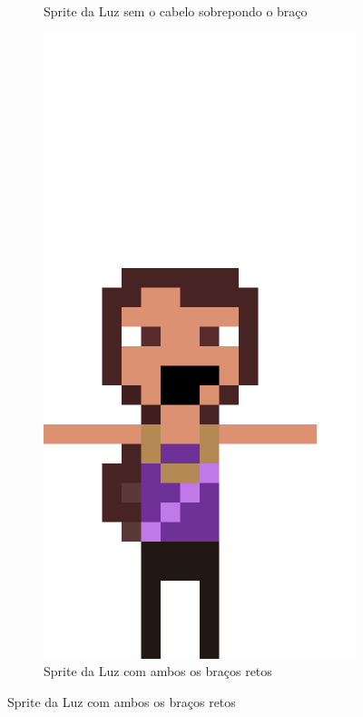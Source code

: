 \begin{figure}[htbp]
\begin{subfigure}{0.32\linewidth}
        \caption{\small Sprite da Luz sem o cabelo sobrepondo o braço}
        \label{fig:sketchIrma2}
    \end{subfigure}
    \begin{subfigure}{0.32\linewidth}
        \includegraphics[width=1\linewidth]{figs/sprites/irma_t_pose.png}
        \caption{\small Sprite da Luz com ambos os braços retos}
        \label{fig:sketchIrma3}
    \end{subfigure}

\end{figure}

